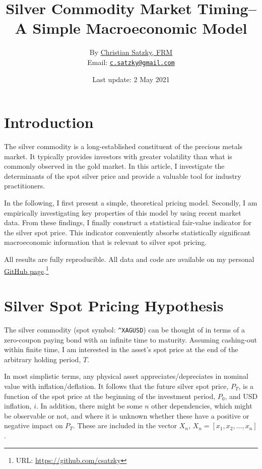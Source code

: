 \documentclass[
  12pt,
]{article}
\title{Silver Commodity Market Timing--\\
A Simple Macroeconomic Model}
\author{By \href{https://www.linkedin.com/in/christian-satzky/}{Christian
Satzky, FRM}\\
Email: \href{mailto:c.satzky@gmail.com}{\nolinkurl{c.satzky@gmail.com}}}
\date{Last update: 2 May 2021}
\begin{document}
\maketitle

\newpage
\hypersetup{linkcolor=black}
\tableofcontents
\newpage
\hypersetup{linkcolor=blue}

\hypertarget{introduction}{%
\section{Introduction}\label{introduction}}

The silver commodity is a long-established constituent of the precious
metals market. It typically provides investors with greater volatility
than what is commonly observed in the gold market. In this article, I
investigate the determinants of the spot silver price and provide a
valuable tool for industry practitioners.

In the following, I first present a simple, theoretical pricing model.
Secondly, I am empirically investigating key properties of this model by
using recent market data. From these findings, I finally construct a
statistical fair-value indicator for the silver spot price. This
indicator conveniently absorbs statistically significant macroeconomic
information that is relevant to silver spot pricing.

All results are fully reproducible. All data and code are available on
my personal \href{https://github.com/csatzky}{GitHub page}.\footnote{URL:
  \url{https://github.com/csatzky}}

\hypertarget{silver-spot-pricing-hypothesis}{%
\section{Silver Spot Pricing
Hypothesis}\label{silver-spot-pricing-hypothesis}}

The silver commodity (spot symbol: \texttt{\^{}XAGUSD}) can be thought
of in terms of a zero-coupon paying bond with an infinite time to
maturity. Assuming cashing-out within finite time, I am interested in
the asset's spot price at the end of the arbitrary holding period,
\(T\).

In most simplistic terms, any physical asset appreciates/depreciates in
nominal value with inflation/deflation. It follows that the future
silver spot price, \(P_T\), is a function of the spot price at the
beginning of the investment period, \(P_0\), and USD inflation, \(i\).
In addition, there might be some \(n\) other dependencies, which might
be observable or not, and where it is unknown whether these have a
positive or negative impact on \(P_T\). These are included in the vector
\(X_n\), \(X_n = [x_1, x_2,..., x_n]\).
\end{document}
